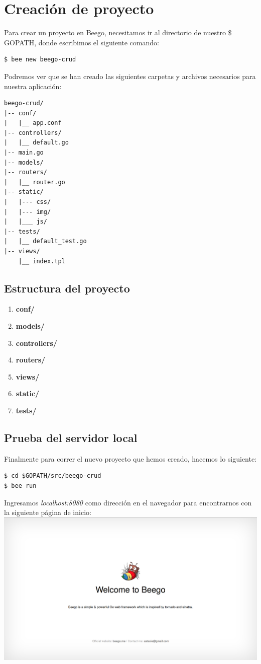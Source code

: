 \documentclass[12pt]{article}
\begin{document}
\section{Creación de proyecto}\label{sec:proy}
\noindent Para crear un proyecto en Beego, necesitamos ir al directorio de nuestro $\$$GOPATH, donde escribimos el siguiente comando:
\begin{verbatim}
$ bee new beego-crud
\end{verbatim}
\noindent Podremos ver que se han creado las siguientes carpetas y archivos necesarios para nuestra aplicación:

\begin{verbatim}
beego-crud/
|-- conf/
|   |__ app.conf
|-- controllers/
|   |__ default.go
|-- main.go
|-- models/
|-- routers/
|   |__ router.go
|-- static/
|   |--- css/
|   |--- img/
|   |___ js/
|-- tests/
|   |__ default_test.go
|-- views/
    |__ index.tpl
\end{verbatim}

\subsection{Estructura del proyecto}
\begin{enumerate}[1)]
\item \textbf{conf/}\label{jiji}
\item \textbf{models/}
\item \textbf{controllers/}
\item \textbf{routers/}
\item \textbf{views/}
\item \textbf{static/}
\item \textbf{tests/}
  
\end{enumerate}


\subsection{Prueba del servidor local}
\noindent Finalmente para correr el nuevo proyecto que hemos creado, hacemos lo siguiente:
\begin{verbatim}
$ cd $GOPATH/src/beego-crud
$ bee run
\end{verbatim}
\noindent Ingresamos \textit{localhost:8080} como dirección en el navegador para encontrarnos con la siguiente página de inicio: \\

\includegraphics[scale=0.25]{beego.png}
\newpage
\end{document}
